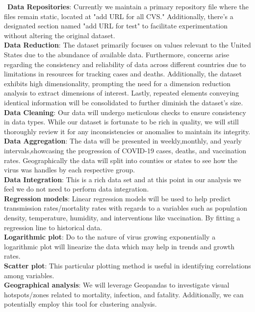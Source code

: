 \documentclass[manuscript,screen,review]{acmart}
\begin{document}
\
\textbf{Data Repositories}: Currently we maintain a primary repository file where the files remain static, located at "add URL for all CVS." Additionally, there's a designated section named "add URL for test" to facilitate experimentation without altering the original dataset.\\
\textbf{Data Reduction}: The dataset primarily focuses on values relevant to the United States due to the abundance of available data. Furthermore, concerns arise regarding the consistency and reliability of data across different countries due to limitations in resources for tracking cases and deaths. Additionally, the dataset exhibits high dimensionality, prompting the need for a dimension reduction analysis to extract dimensions of interest. Lastly, repeated elements conveying identical information will be consolidated to further diminish the dataset's size.\\
\textbf{Data Cleaning}: Our data will undergo meticulous checks to ensure consistency in data types. While our dataset is fortunate to be rich in quality, we will still thoroughly review it for any inconsistencies or anomalies to maintain its integrity. \\
\textbf{Data Aggregation}: The data will be presented in weekly,monthly, and yearly intervals,showcasing the progression of COVID-19 cases, deaths, and vaccination rates. Geographically the data will split into counties or states to see how the virus was handles by each respective group.\\ 
\textbf{Data Integration}: This is a rich data set and at this point in our analysis we feel we do not need to perform data integration. \\
\textbf{Regression models}: Linear regression models will be used to help predict transmission rates/mortality rates with regards to a variables such as population density, temperature, humidity, and interventions like vaccination. By fitting a regression line to historical data. \\
\textbf{Logarithmic plot}: Do to the nature of virus growing exponentially a logarithmic plot will linearize the data which may help in trends and growth rates. \\
\textbf{Scatter plot}: This particular plotting method is useful in identifying correlations among variables. \\
\textbf{Geographical analysis}: We will leverage Geopandas to investigate visual hotspots/zones related to mortality, infection, and fatality. Additionally, we can potentially employ this tool for clustering analysis. \\ 
\end{document}
